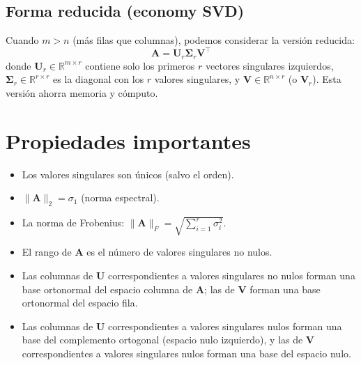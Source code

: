 \documentclass[12pt,a4paper,openany,oneside]{book}
\begin{document}
\begin{center}
\end{center}

\subsection{Forma reducida (economy SVD)}
Cuando $m > n$ (más filas que columnas), podemos considerar la versión reducida:
\[
\mathbf{A} = \mathbf{U}_r \boldsymbol{\Sigma}_r \mathbf{V}^\top
\]
donde $\mathbf{U}_r \in \mathbb{R}^{m \times r}$ contiene solo los primeros $r$ vectores singulares izquierdos, $\boldsymbol{\Sigma}_r \in \mathbb{R}^{r \times r}$ es la diagonal con los $r$ valores singulares, y $\mathbf{V} \in \mathbb{R}^{n \times r}$ (o $\mathbf{V}_r$). Esta versión ahorra memoria y cómputo.

\section{Propiedades importantes}

\begin{itemize}
    \item Los valores singulares son únicos (salvo el orden).
    \item $\|\mathbf{A}\|_2 = \sigma_1$ (norma espectral).
    \item La norma de Frobenius: $\|\mathbf{A}\|_F = \sqrt{\sum_{i=1}^r \sigma_i^2}$.
    \item El rango de $\mathbf{A}$ es el número de valores singulares no nulos.
    \item Las columnas de $\mathbf{U}$ correspondientes a valores singulares no nulos forman una base ortonormal del espacio columna de $\mathbf{A}$; las de $\mathbf{V}$ forman una base ortonormal del espacio fila.
    \item Las columnas de $\mathbf{U}$ correspondientes a valores singulares nulos forman una base del complemento ortogonal (espacio nulo izquierdo), y las de $\mathbf{V}$ correspondientes a valores singulares nulos forman una base del espacio nulo.
\end{itemize}
\end{document}
